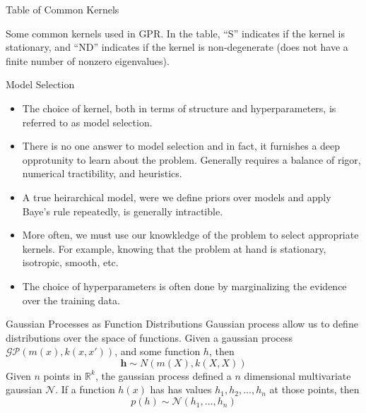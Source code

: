 \documentclass[10pt]{beamer}
\begin{document}
\begin{frame}{Table of Common Kernels}
  \begin{center}
  \end{center}
  \begin{center}
    Some common kernels used in GPR. In the table, ``S'' indicates if the kernel is stationary, and ``ND'' indicates if the kernel is non-degenerate (does not have a finite number of nonzero eigenvalues).
  \end{center}
\end{frame}

\begin{frame}{Model Selection}
  \begin{itemize}
  \item The choice of kernel, both in terms of structure and hyperparameters, is referred to as model selection. 
  \item There is no one answer to model selection and in fact, it furnishes a deep opprotunity to learn about the problem.
    Generally requires a balance of rigor, numerical tractibility, and heuristics.  
  \item A true heirarchical model, were we define priors over models and apply Baye's rule repeatedly, is generally intractible.
  \item More often, we must use our knowkledge of the problem to select appropriate kernels. For example, knowing that the problem at hand is stationary, isotropic, smooth, etc. 
  \item The choice of hyperparameters is often done by marginalizing the evidence over the training data.
  \end{itemize}
\end{frame}

\begin{frame}{Gaussian Processes as Function Distributions}
  Gaussian process allow us to define distributions over the space of functions. Given a gaussian process $\mathcal{GP} \left( m(x) , k(x,x') \right)$, and some function $h$, then
  \begin{equation}
    \mathbf{h} \sim N(m(X) , k(X,X))
  \end{equation}
  Given $n$ points in $\mathbb{R}^{k}$, the gaussian process defined a $n$ dimensional multivariate gaussian $\mathcal{N}$. If a function $h(x)$ has has values $h_1,h_2,...,h_{n}$ at those points, then
  \begin{equation}
    p \left( h \right) \sim \mathcal{N}(h_{1}, ..., h_{n})
  \end{equation}

  \begin{center}
  \end{center}
\end{frame}
\end{document}
